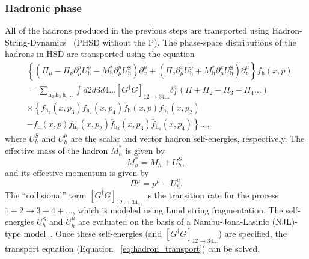 \subsubsection{Hadronic phase}
All of the hadrons produced in the previous steps are transported using Hadron-String-Dynamics~\cite{HSD} (PHSD without the P). The phase-space distributions of the hadrons in HSD are transported using the equation
\begin{equation}
\label{eq:hadron_transport}
\begin{aligned}
& \left\{\left(\Pi_\mu-\Pi_\nu \partial_\mu^p U_{\mathrm{h}}^\nu-M_{\mathrm{h}}^* \partial_\mu^p U_{\mathrm{h}}^{\mathrm{S}}\right) \partial_x^\mu+\left(\Pi_\nu \partial_\mu^x U_{\mathrm{h}}^\nu+M_{\mathrm{h}}^* \partial_\mu^x U_{\mathrm{h}}^{\mathrm{S}}\right) \partial_p^\mu\right\} f_{\mathrm{h}}(x, p) \\
& =\sum_{\mathrm{h}_2 \mathrm{~h}_3 \mathrm{~h}_4 \ldots} \int d 2 d 3 d 4 \ldots\left[G^{\dagger} G\right]_{12 \rightarrow 34 \ldots} \delta_{\Gamma}^4\left(\Pi+\Pi_2-\Pi_3-\Pi_4 \ldots\right) \\
& \times\left\{f_{\mathrm{h}_3}\left(x, p_3\right) f_{\mathrm{h}_4}\left(x, p_4\right) \bar{f}_{\mathrm{h}}(x, p) \bar{f}_{\mathrm{h}_2}\left(x, p_2\right)\right. \\
& \left.-f_{\mathrm{h}}(x, p) f_{\mathrm{h}_2}\left(x, p_2\right) \bar{f}_{\mathrm{h}_3}\left(x, p_3\right) \bar{f}_{\mathrm{h}_4}\left(x, p_4\right)\right\} \ldots,
\end{aligned}
\end{equation}
where $U_h^S$ and $U_h^\mu$ are the scalar and vector hadron self-energies, respectively. The effective mass of the hadron $M_h^*$ is given by
\begin{equation}
    M_h^* = M_h + U_h^S,
\end{equation}
and its effective momentum is given by
\begin{equation}
    \Pi^\mu = p^\mu - U_h^\mu.
\end{equation}
The ``collisional'' term $\left[G^\dagger G\right]_{12 \rightarrow 34 \ldots}$ is the transition rate for the process $1 + 2 \rightarrow 3 + 4 + \ldots$, which is modeled using Lund string fragmentation. The self-energies $U_h^S$ and $U_h^\mu$ are evaluated on the basis of a Nambu-Jona-Lasinio (NJL)-type model~\cite{NJL}. Once these self-energies (and $\left[G^\dagger G\right]_{12 \rightarrow 34 \ldots}$) are specified, the transport equation (Equation ~\ref{eq:hadron_transport}) can be solved.

